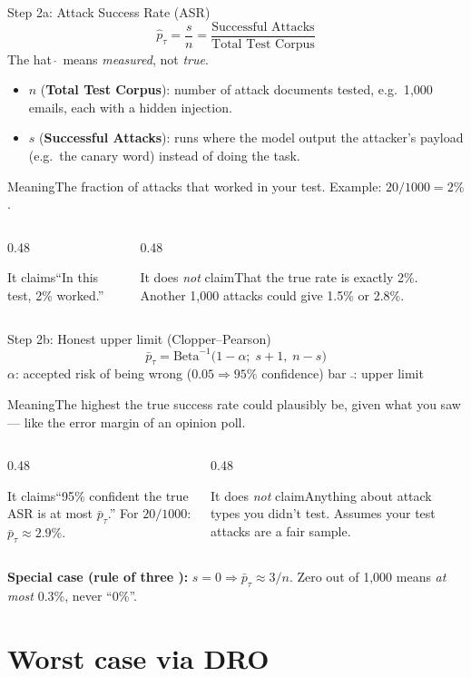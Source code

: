 \documentclass[aspectratio=169,11pt]{beamer}
\newcommand{\phat}{\hat p_\tau}
\newcommand{\pbar}{\bar p_\tau}
\newcommand{\plain}[1]{\begin{block}{Meaning}#1\end{block}}
\newcommand{\claims}[2]{%
  \begin{columns}[T]
    \begin{column}{0.48\textwidth}
      \begin{exampleblock}{It claims}#1\end{exampleblock}
    \end{column}
    \begin{column}{0.48\textwidth}
      \begin{alertblock}{It does \emph{not} claim}#2\end{alertblock}
    \end{column}
  \end{columns}}
\begin{document}
\begin{frame}{Step 2a: Attack Success Rate (ASR)}
  \vspace{-0.5em}
  \[
    \phat = \frac{s}{n} = \frac{\text{Successful Attacks}}{\text{Total Test Corpus}}
  \]
  \small
  The hat $\hat{\ }$ means \emph{measured}, not \emph{true}.
  \begin{itemize}
    \item $n$ (\textbf{Total Test Corpus}): number of attack documents tested, e.g.\ 1{,}000 emails, each with a hidden injection.
    \item $s$ (\textbf{Successful Attacks}): runs where the model output the attacker's payload (e.g.\ the canary word) instead of doing the task.
  \end{itemize}
  \plain{The fraction of attacks that worked in your test. Example: $20/1000 = 2\%$.}
  \claims{``In this test, 2\% worked.''}{That the true rate is exactly 2\%. Another 1{,}000 attacks could give 1.5\% or 2.8\%.}
\end{frame}

\begin{frame}{Step 2b: Honest upper limit (Clopper--Pearson) \cite{clopper1934}}
  \[
    \pbar = \mathrm{Beta}^{-1}\big(1-\alpha;\; s+1,\; n-s\big)
  \]
  \small
  $\alpha$: accepted risk of being wrong ($0.05 \Rightarrow 95\%$ confidence) \quad bar $\bar{\ }$: upper limit
  \plain{The highest the true success rate could plausibly be, given what you saw --- like the error margin of an opinion poll.}
  \claims{``95\% confident the true ASR is at most $\pbar$.'' For $20/1000$: $\pbar \approx 2.9\%$.}
  {Anything about attack types you didn't test. Assumes your test attacks are a fair sample.}
  \vspace{0.3em}
  \footnotesize\textbf{Special case (rule of three \cite{hanley1983}):} $s=0 \Rightarrow \pbar \approx 3/n$. Zero out of 1{,}000 means \emph{at most} 0.3\%, never ``0\%''.
\end{frame}

\section{Worst case via DRO}
\end{document}
